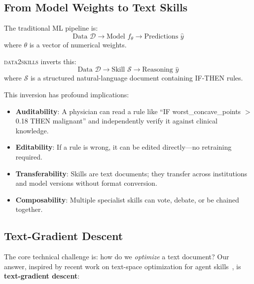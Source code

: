 \documentclass{article}
\begin{document}
\subsection{From Model Weights to Text Skills}

The traditional ML pipeline is:
\begin{equation}
\text{Data } \mathcal{D} \longrightarrow \text{Model } f_\theta \longrightarrow \text{Predictions } \hat{y}
\end{equation}
where $\theta$ is a vector of numerical weights.

\textsc{data2skills} inverts this:
\begin{equation}
\text{Data } \mathcal{D} \longrightarrow \text{Skill } \mathcal{S} \longrightarrow \text{Reasoning } \hat{y}
\end{equation}
where $\mathcal{S}$ is a structured natural-language document containing IF-THEN rules.

This inversion has profound implications:
\begin{itemize}
    \item \textbf{Auditability}: A physician can read a rule like ``IF worst\_concave\_points $>$ 0.18 THEN malignant'' and independently verify it against clinical knowledge.
    \item \textbf{Editability}: If a rule is wrong, it can be edited directly---no retraining required.
    \item \textbf{Transferability}: Skills are text documents; they transfer across institutions and model versions without format conversion.
    \item \textbf{Composability}: Multiple specialist skills can vote, debate, or be chained together.
\end{itemize}

\subsection{Text-Gradient Descent}

The core technical challenge is: how do we \emph{optimize} a text document?
Our answer, inspired by recent work on text-space optimization for agent skills~\cite{skillopt2026,skillgrad2026,textgrad2024}, is \textbf{text-gradient descent}:
\end{document}
